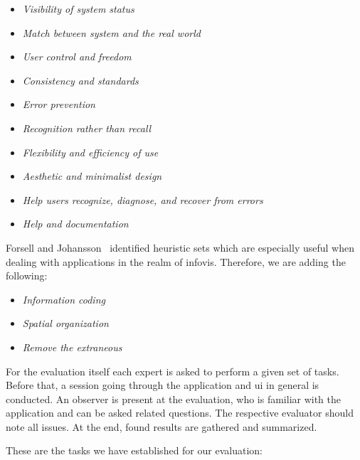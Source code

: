 \begin{itemize}
  \item \emph{Visibility of system status}
  \item \emph{Match between system and the real world}
  \item \emph{User control and freedom}
  \item \emph{Consistency and standards}
  \item \emph{Error prevention}
  \item \emph{Recognition rather than recall}
  \item \emph{Flexibility and efficiency of use}
  \item \emph{Aesthetic and minimalist design}
  \item \emph{Help users recognize, diagnose, and recover from errors}
  \item \emph{Help and documentation}
\end{itemize}

Forsell and Johansson~\cite{Forsell2010} identified heuristic sets which are especially useful when dealing with applications in the realm of \gls{infovis}.
Therefore, we are adding the following:

\begin{itemize}
  \item \emph{Information coding}
  \item \emph{Spatial organization}
  \item \emph{Remove the extraneous}
\end{itemize}

For the evaluation itself each expert is asked to perform a given set of tasks.
Before that, a session going through the application and \gls{ui} in general is conducted.
An observer is present at the evaluation, who is familiar with the application and can be asked related questions.
The respective evaluator should note all issues.
At the end, found results are gathered and summarized.

These are the tasks we have established for our evaluation:


